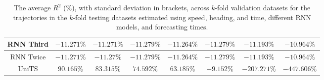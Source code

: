 \begin{table}[!ht]
{\begin{tabular}{|c|c|c|c|c|c|c|c|}
			RNN Third & $-11.271\%$ & $-11.271\%$ & $-11.279\%$ & $-11.264\%$ & $-11.279\%$ & $-11.193\%$ & $-10.964\%$ \\ \hline
			RNN Twice & $-11.271\%$ & $-11.27\%$ & $-11.279\%$ & $-11.264\%$ & $-11.279\%$ & $-11.193\%$ & $-10.964\%$ \\ \hline
			UniTS & $90.165\%$ & $83.315\%$ & $74.592\%$ & $63.185\%$ & $-9.152\%$ & $-207.271\%$ & $-447.606\%$ \\ \hline
		\end{tabular}
	}
	\caption{The average $R^{2}$ (\%), with standard deviation in brackets, across $k$-fold validation datasets for the trajectories in the $k$-fold testing datasets estimated using speed, heading, and time, different RNN models, and forecasting times.}
	\label{tab:all_speed_actual_dir_R2}
\end{table}

